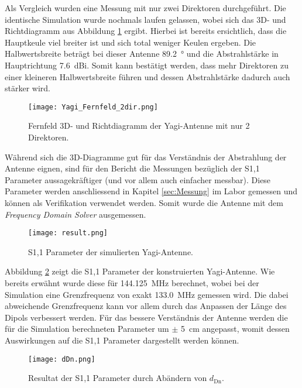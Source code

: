 Als Vergleich wurden eine Messung mit nur zwei Direktoren durchgeführt. Die identische Simulation wurde nochmals laufen gelassen, wobei sich das 3D- und Richtdiagramm aus Abbildung \ref{fig:Simulation_Yagi_Fernfeld_2dir} ergibt. Hierbei ist bereits ersichtlich, dass die Hauptkeule viel breiter ist und sich total weniger Keulen ergeben. Die Halbwertsbreite beträgt bei dieser Antenne \SI{89.2}{\degree} und die Abstrahlstärke in Hauptrichtung \SI{7.6}{dBi}. Somit kann bestätigt werden, dass mehr Direktoren zu einer kleineren Halbwertsbreite führen und dessen Abstrahlstärke dadurch auch stärker wird.

\begin{figure}[h!]
	\centering
	\texttt{[image: Yagi\_Fernfeld\_2dir.png]}
	\caption{Fernfeld 3D- und Richtdiagramm der Yagi-Antenne mit nur 2 Direktoren.}
	\label{fig:Simulation_Yagi_Fernfeld_2dir}
\end{figure}

\newpage

Während sich die 3D-Diagramme gut für das Verständnis der Abstrahlung der Antenne eignen, sind für den Bericht  die Messungen bezüglich der S1,1 Parameter aussagekräftiger (und vor allem auch einfacher messbar). Diese Parameter werden anschliessend in Kapitel \ref{sec:Messung} im Labor gemessen und können als Verifikation verwendet werden. Somit wurde die Antenne mit dem \textit{Frequency Domain Solver} ausgemessen.

\begin{figure}[h!]
	\centering
	\texttt{[image: result.png]}
	\caption{S1,1 Parameter der simulierten Yagi-Antenne.}
	\label{fig:Simulation_result}
\end{figure}

Abbildung \ref{fig:Simulation_result} zeigt die S1,1 Parameter der konstruierten Yagi-Antenne. Wie bereits erwähnt wurde diese für \SI{144.125}{MHz} berechnet, wobei bei der Simulation eine Grenzfrequenz von exakt \SI{133.0}{MHz} gemessen wird. Die dabei abweichende Grenzfrequenz kann vor allem durch das Anpassen der Länge des Dipols verbessert werden. Für das bessere Verständnis der Antenne werden die für die Simulation berechneten Parameter um $\pm$ \SI{5}{cm} angepasst, womit dessen Auswirkungen auf die S1,1 Parameter dargestellt werden können.

\begin{figure}[h!]
	\centering
	\texttt{[image: dDn.png]}
	\caption{Resultat der S1,1 Parameter durch Abändern von $d_\mathrm{Dn}$.}
	\label{fig:Simulation_dDn}
\end{figure}

